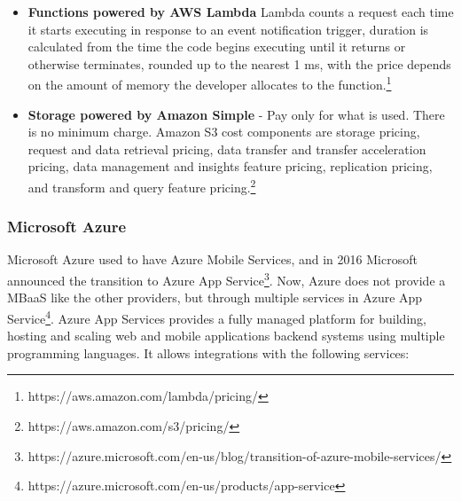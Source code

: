 \begin{itemize}
	\item \textbf{Functions powered by AWS Lambda} Lambda counts a request each time it starts executing in response to an event notification trigger, duration is calculated from the time the code begins executing until it returns or otherwise terminates, rounded up to the nearest 1 ms, with the price depends on the amount of memory the developer allocates to the function.\footnote{https://aws.amazon.com/lambda/pricing/}
	\item \textbf{Storage powered by Amazon Simple} - Pay only for what is used. There is no minimum charge. Amazon S3 cost components are storage pricing, request and data retrieval pricing, data transfer and transfer acceleration pricing, data management and insights feature pricing, replication pricing, and transform and query feature pricing.\footnote{https://aws.amazon.com/s3/pricing/}
\end{itemize}

\subsubsection{\textbf{Microsoft Azure}}

Microsoft Azure used to have Azure Mobile Services, and in 2016 Microsoft announced the transition to Azure App  Service\footnote{https://azure.microsoft.com/en-us/blog/transition-of-azure-mobile-services/}.
Now, Azure does not provide a MBaaS like the other providers, but through multiple services in Azure App Service\footnote{https://azure.microsoft.com/en-us/products/app-service}. Azure App Services provides a fully managed platform for building, hosting and scaling web and mobile applications backend systems using multiple programming languages\cite{azureappservices}. It allows integrations with the following services:

